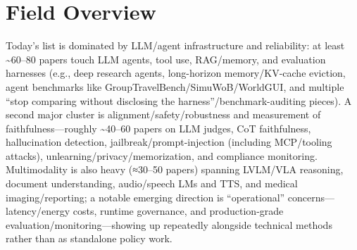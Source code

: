 \documentclass[12pt,letterpaper]{article}
\begin{document}
\medskip



\section*{Field Overview}
{\footnotesize Today's list is dominated by LLM/agent infrastructure and reliability: at least \textasciitilde{}60--80 papers touch LLM agents, tool use, RAG/memory, and evaluation harnesses (e.g., deep research agents, long-horizon memory/KV-cache eviction, agent benchmarks like GroupTravelBench/SimuWoB/WorldGUI, and multiple ``stop comparing without disclosing the harness''/benchmark-auditing pieces). A second major cluster is alignment/safety/robustness and measurement of faithfulness---roughly \textasciitilde{}40--60 papers on LLM judges, CoT faithfulness, hallucination detection, jailbreak/prompt-injection (including MCP/tooling attacks), unlearning/privacy/memorization, and compliance monitoring. Multimodality is also heavy (≈30--50 papers) spanning LVLM/VLA reasoning, document understanding, audio/speech LMs and TTS, and medical imaging/reporting; a notable emerging direction is ``operational'' concerns---latency/energy costs, runtime governance, and production-grade evaluation/monitoring---showing up repeatedly alongside technical methods rather than as standalone policy work.}
\end{document}
